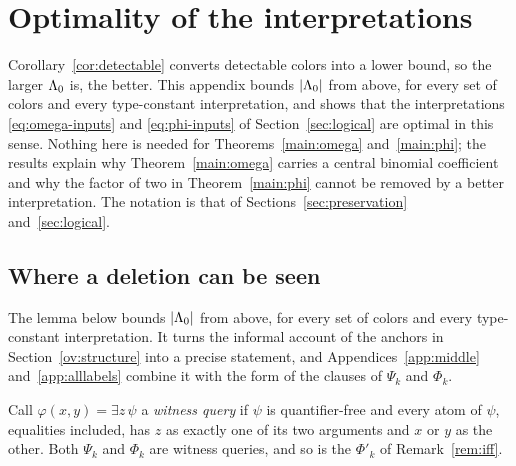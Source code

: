 \section{Optimality of the interpretations}\label{app:optimality}
Corollary~\ref{cor:detectable} converts detectable colors into a lower
bound, so the larger $\Lambda_0$ is, the better. This appendix bounds $|\Lambda_0|$
from above, for every set of colors and every type-constant interpretation,
and shows that the interpretations \eqref{eq:omega-inputs} and
\eqref{eq:phi-inputs} of Section~\ref{sec:logical} are optimal in this
sense. Nothing here is needed for Theorems~\ref{main:omega}
and~\ref{main:phi}; the results explain why Theorem~\ref{main:omega}
carries a central binomial coefficient and why the factor of two in
Theorem~\ref{main:phi} cannot be removed by a better interpretation. The
notation is that of Sections~\ref{sec:preservation} and~\ref{sec:logical}.

\subsection{Where a deletion can be seen}\label{app:where}
The lemma below bounds $|\Lambda_0|$ from above, for every set of colors and
every type-constant interpretation. It turns the informal account of the
anchors in Section~\ref{ov:structure} into a precise statement, and
Appendices~\ref{app:middle} and~\ref{app:alllabels} combine it with the
form of the clauses of $\Psi_k$ and $\Phi_k$.

Call $\varphi(x,y)=\exists z\,\psi$ a \emph{witness query} if $\psi$ is
quantifier-free and every atom of $\psi$, equalities included, has $z$ as
exactly one of its two arguments and $x$ or $y$ as the other. Both $\Psi_k$
and
$\Phi_k$ are witness queries, and so is the $\Phi'_k$ of
Remark~\ref{rem:iff}.

